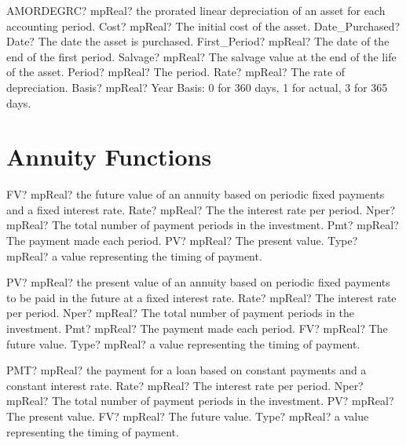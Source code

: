 \documentclass[12pt,a4paper,openany]{book}
\begin{document}
\begin{mpFunctionsExtract}
\mpWorksheetFunctionSevenNotImplemented
{AMORDEGRC? mpReal? the prorated linear depreciation of an asset for each accounting period.}
{Cost? mpReal?  The initial cost of the asset.}
{Date\_Purchased? Date? The date the asset is purchased.}
{First\_Period? mpReal? The date of the end of the first period.}
{Salvage? mpReal? The salvage value at the end of the life of the asset.}
{Period? mpReal? The period.}
{Rate? mpReal? The rate of depreciation.}
{Basis? mpReal? Year Basis: 0 for 360 days, 1 for actual, 3 for 365 days.}
\end{mpFunctionsExtract}

\section{Annuity Functions}

\begin{mpFunctionsExtract}
\mpWorksheetFunctionFiveNotImplemented
{FV? mpReal? the future value of an annuity based on periodic fixed payments and a fixed interest rate.}
{Rate? mpReal? The the interest rate per period.}
{Nper? mpReal? The total number of payment periods in the investment.}
{Pmt? mpReal? The payment made each period.}
{PV? mpReal? The present value.}
{Type? mpReal? a value representing the timing of payment.}
\end{mpFunctionsExtract}

\begin{mpFunctionsExtract}
\mpWorksheetFunctionFiveNotImplemented
{PV? mpReal? the present value of an annuity based on periodic fixed payments to be paid in the future at a fixed interest rate.}
{Rate? mpReal? The interest rate per period.}
{Nper? mpReal? The total number of payment periods in the investment.}
{Pmt? mpReal? The payment made each period.}
{FV? mpReal? The future value.}
{Type? mpReal? a value representing the timing of payment.}
\end{mpFunctionsExtract}

\begin{mpFunctionsExtract}
\mpWorksheetFunctionFiveNotImplemented
{PMT? mpReal? the payment for a loan based on constant payments and a constant interest rate.}
{Rate? mpReal? The interest rate per period.}
{Nper? mpReal? The total number of payment periods in the investment.}
{PV? mpReal? The present value.}
{FV? mpReal? The future value.}
{Type? mpReal? a value representing the timing of payment.}
\end{mpFunctionsExtract}
\end{document}
